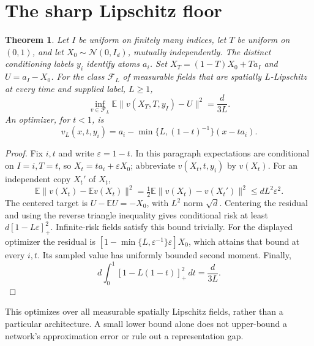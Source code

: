 \documentclass[11pt]{article}
\newtheorem{theorem}{Theorem}
\newcommand{\E}{\mathbb E}
\newcommand{\eps}{\varepsilon}
\begin{document}
\section{The sharp Lipschitz floor}
\begin{theorem}\label{thm:sharp}
Let $I$ be uniform on finitely many indices, let $T$ be uniform on $(0,1)$,
and let $X_0\sim\mathcal N(0,I_d)$, mutually independently. The distinct
conditioning labels $y_i$ identify atoms $a_i$. Set
$X_T=(1-T)X_0+Ta_I$ and $U=a_I-X_0$.
For the class $\mathcal F_L$ of measurable fields that are spatially
$L$-Lipschitz at every time and supplied label, $L\ge1$,
\[
\inf_{v\in\mathcal F_L}\E\lVert v(X_T,T,y_I)-U\rVert^2=\frac{d}{3L}.
\]
An optimizer, for $t<1$, is
\[
v_L(x,t,y_i)=a_i-\min\{L,(1-t)^{-1}\}(x-ta_i).
\]
\end{theorem}
\begin{proof}
Fix $i,t$ and write $\eps=1-t$. In this paragraph expectations are conditional
on $I=i,T=t$, so $X_t=ta_i+\eps X_0$; abbreviate $v(X_t,t,y_i)$ by $v(X_t)$.
For an independent copy $X_t'$ of $X_t$,
\[
\E\lVert v(X_t)-\E v(X_t)\rVert^2
=\tfrac12\E\lVert v(X_t)-v(X_t')\rVert^2\le dL^2\eps^2.
\]
The centered target is $U-\E U=-X_0$, with $L^2$ norm $\sqrt d$. Centering the residual and
using the reverse triangle inequality gives conditional risk at least
$d[1-L\eps]_+^2$. Infinite-risk fields satisfy this bound trivially.
For the displayed optimizer the residual is
$[1-\min\{L,\eps^{-1}\}\eps]X_0$, which attains that bound at every $i,t$.
Its sampled value has uniformly bounded second moment. Finally,
\[
d\int_0^1[1-L(1-t)]_+^2\,dt=\frac{d}{3L}.
\]
\end{proof}
This optimizes over all measurable spatially Lipschitz fields, rather than a
particular architecture. A small lower bound alone does not upper-bound a
network's approximation error or rule out a representation gap.
\end{document}
